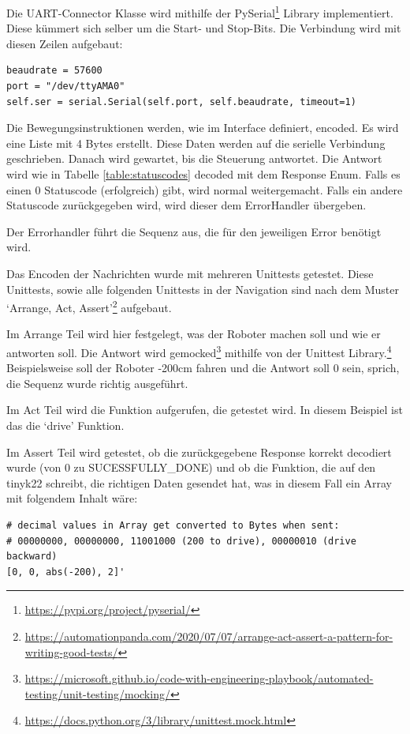 Die UART-Connector Klasse  wird mithilfe der PySerial\footnote{\url{https://pypi.org/project/pyserial/}} Library implementiert. Diese kümmert sich selber um die Start- und Stop-Bits.
Die Verbindung wird mit diesen Zeilen aufgebaut:

\begin{verbatim}
beaudrate = 57600
port = "/dev/ttyAMA0"
self.ser = serial.Serial(self.port, self.beaudrate, timeout=1)
\end{verbatim}

Die Bewegungsinstruktionen werden, wie im Interface definiert, encoded. Es wird eine Liste mit 4 Bytes erstellt.
Diese Daten werden auf die serielle Verbindung geschrieben.
Danach wird gewartet, bis die Steuerung antwortet. Die Antwort wird wie in Tabelle \ref{table:statuscodes} decoded mit dem Response Enum.
Falls es einen 0 Statuscode (erfolgreich) gibt, wird normal weitergemacht. Falls ein andere Statuscode zurückgegeben wird, wird dieser dem ErrorHandler übergeben.

Der Errorhandler führt die Sequenz aus, die für den jeweiligen Error benötigt wird.

Das Encoden der Nachrichten wurde mit mehreren Unittests getestet. Diese Unittests, sowie alle folgenden Unittests in der Navigation sind nach dem Muster `Arrange, Act, Assert'\footnote{\url{https://automationpanda.com/2020/07/07/arrange-act-assert-a-pattern-for-writing-good-tests/}} aufgebaut.

Im Arrange Teil wird hier festgelegt, was der Roboter machen soll und wie er antworten soll. Die Antwort wird gemocked\footnote{\url{https://microsoft.github.io/code-with-engineering-playbook/automated-testing/unit-testing/mocking/}} mithilfe von der Unittest Library.\footnote{\url{https://docs.python.org/3/library/unittest.mock.html}} Beispielsweise soll der Roboter -200cm fahren und die Antwort soll 0 sein, sprich, die Sequenz wurde richtig ausgeführt.

Im Act Teil wird die Funktion aufgerufen, die getestet wird. In diesem Beispiel ist das die `drive' Funktion.

Im Assert Teil wird getestet, ob die zurückgegebene Response korrekt decodiert wurde (von 0 zu SUCESSFULLY\_DONE) und ob die Funktion, die auf den \gls{tinyk22} schreibt, die richtigen Daten gesendet hat, was in diesem Fall ein Array mit folgendem Inhalt wäre:

\begin{verbatim}
# decimal values in Array get converted to Bytes when sent:
# 00000000, 00000000, 11001000 (200 to drive), 00000010 (drive backward)
[0, 0, abs(-200), 2]'
\end{verbatim}

